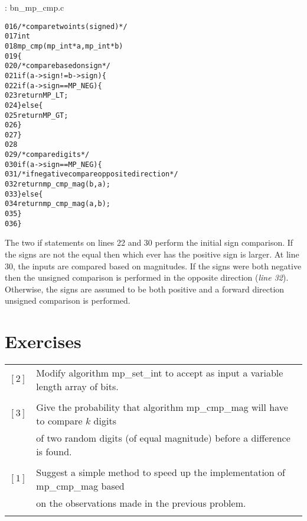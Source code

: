 \documentclass[b5paper]{book}
\begin{document}
\vspace{+3mm}\begin{small}
\hspace{-5.1mm}{\bf File}: bn\_mp\_cmp.c
\vspace{-3mm}
\begin{alltt}
016   /* compare two ints (signed)*/
017   int
018   mp_cmp (mp_int * a, mp_int * b)
019   \{
020     /* compare based on sign */
021     if (a->sign != b->sign) \{
022        if (a->sign == MP_NEG) \{
023           return MP_LT;
024        \} else \{
025           return MP_GT;
026        \}
027     \}
028     
029     /* compare digits */
030     if (a->sign == MP_NEG) \{
031        /* if negative compare opposite direction */
032        return mp_cmp_mag(b, a);
033     \} else \{
034        return mp_cmp_mag(a, b);
035     \}
036   \}
\end{alltt}
\end{small}

The two if statements on lines 22 and 30 perform the initial sign comparison.  If the signs are not the equal then which ever
has the positive sign is larger.   At line 30, the inputs are compared based on magnitudes.  If the signs were both negative then 
the unsigned comparison is performed in the opposite direction (\textit{line 32}).  Otherwise, the signs are assumed to 
be both positive and a forward direction unsigned comparison is performed.

\section*{Exercises}
\begin{tabular}{cl}
$\left [ 2 \right ]$ & Modify algorithm mp\_set\_int to accept as input a variable length array of bits. \\
                     & \\
$\left [ 3 \right ]$ & Give the probability that algorithm mp\_cmp\_mag will have to compare $k$ digits  \\
                     & of two random digits (of equal magnitude) before a difference is found. \\
                     & \\
$\left [ 1 \right ]$ & Suggest a simple method to speed up the implementation of mp\_cmp\_mag based  \\
                     & on the observations made in the previous problem. \\
                     &
\end{tabular}
\end{document}
